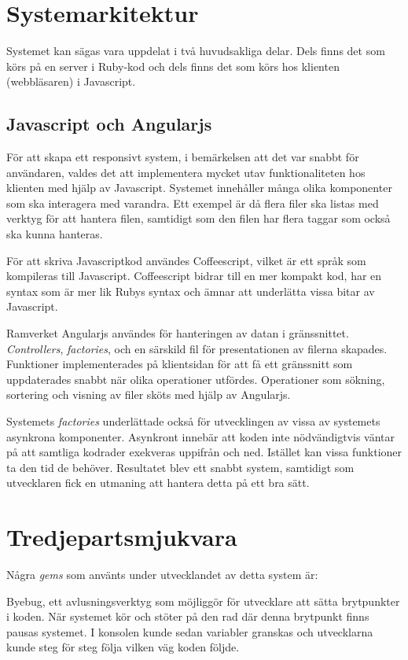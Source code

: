 \section{Systemarkitektur}
Systemet kan sägas vara uppdelat i två huvudsakliga delar. Dels finns det som körs på en server i Ruby-kod och dels finns det som körs hos klienten (webbläsaren) i Javascript.

\subsection{Javascript och Angularjs}
För att skapa ett responsivt system, i bemärkelsen att det var snabbt för användaren, valdes det att implementera mycket utav funktionaliteten hos klienten med hjälp av Javascript. Systemet innehåller många olika komponenter som ska interagera med varandra. Ett exempel är då flera filer ska listas med verktyg för att hantera filen, samtidigt som den filen har flera taggar som också ska kunna hanteras.

För att skriva Javascriptkod användes Coffeescript, vilket är ett språk som kompileras till Javascript. Coffeescript bidrar till en mer kompakt kod, har en syntax som är mer lik Rubys syntax och ämnar att underlätta vissa bitar av Javascript. \cite{coffee}

Ramverket Angularjs användes för hanteringen av datan i gränssnittet. \textit{Controllers}, \textit{factories}\cite{angularwebb}, och en särskild fil för presentationen av filerna skapades. Funktioner implementerades på klientsidan för att få ett gränssnitt som uppdaterades snabbt när olika operationer utfördes. Operationer som sökning, sortering och visning av filer sköts med hjälp av Angularjs.

Systemets \textit{factories} underlättade också för utvecklingen av vissa av systemets asynkrona komponenter. Asynkront innebär att koden inte nödvändigtvis väntar på att samtliga kodrader exekveras uppifrån och ned. Istället kan vissa funktioner ta den tid de behöver. Resultatet blev ett snabbt system, samtidigt som utvecklaren fick en utmaning att hantera detta på ett bra sätt.

\section{Tredjepartsmjukvara}
Några \textit{gems} som använts under utvecklandet av detta system är:

Byebug, ett avlusningsverktyg som möjliggör för utvecklare att sätta brytpunkter i koden. När systemet kör och stöter på den rad där denna brytpunkt finns pausas systemet. I konsolen kunde sedan variabler granskas och utvecklarna kunde steg för steg följa vilken väg koden följde.

